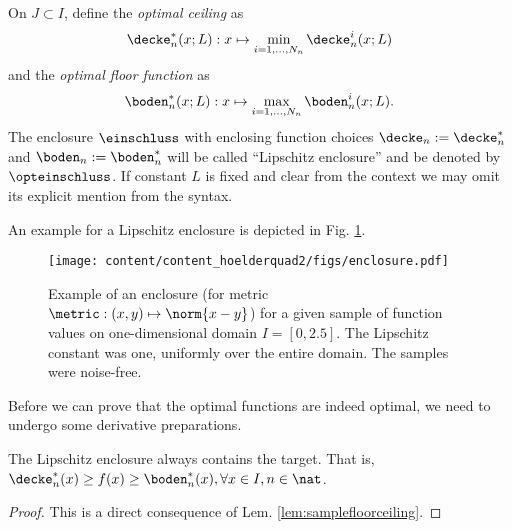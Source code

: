 \begin{defn} On  $J \subset I$, define the \emph{optimal ceiling} as
\[\decke^*_n (x; L) : x \mapsto  \min_{i=1,\ldots,N_n} \decke^i_n(x;L)\]
and the \emph{optimal floor function} as
 \[\boden^*_n (x; L) :x \mapsto   \max_{i=1,\ldots,N_n} \boden^i_n(x; L).\]
The enclosure $\einschluss$ with enclosing function choices $\decke_n := \decke_n^*$ and $\boden_n := \boden_n^*$ will be called ``Lipschitz enclosure'' and be denoted by $\opteinschluss$.
If constant $L$ is fixed and clear from the context we may omit its explicit mention from the syntax.
\end{defn}
An example for a Lipschitz enclosure is depicted in Fig. \ref{figlipencl_nonoise_neo}.
\begin{figure*}
%
	\centering
		\texttt{[image: content/content\_hoelderquad2/figs/enclosure.pdf]}
	\caption{Example of an enclosure (for metric $\metric: (x,y) \mapsto \norm{x-y}$) for a given sample of function values on one-dimensional domain $I = [0,2.5]$. The Lipschitz constant was one, uniformly over the entire domain. The samples were noise-free.}
	\label{figlipencl_nonoise_neo}
\end{figure*}

Before we can prove that the optimal functions are indeed optimal, we need to undergo some derivative preparations.

\begin{lem} \label{lem:optenclcontainstarget}
The Lipschitz enclosure always contains the target. That is, $\decke^*_n(x) \geq f(x) \geq \boden^*_n(x), \forall x \in I, n \in \nat$.
\begin{proof}
This is a direct consequence of Lem. \ref{lem:samplefloorceiling}.
\end{proof}
\end{lem}


